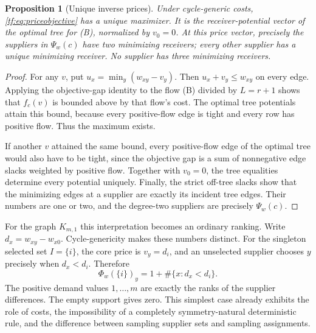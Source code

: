 \documentclass[11pt]{article}
\numberwithin{equation}{section}
\newtheorem{proposition}[theorem]{Proposition}
\theoremstyle{definition}
\begin{document}
\begin{proposition}[Unique inverse prices]
\label{tf:prop:prices}
Under cycle-generic costs, \eqref{tf:eq:priceobjective} has a unique
maximizer. It is the receiver-potential vector of the optimal tree for
(B), normalized by $v_0=0$. At this price vector, precisely the suppliers
in $\Psi_w(c)$ have two minimizing receivers; every other supplier has a
unique minimizing receiver. No supplier has three minimizing receivers.
\end{proposition}
\begin{proof}
For any $v$, put $u_x=\min_y(w_{xy}-v_y)$. Then
$u_x+v_y\le w_{xy}$ on every edge. Applying the objective-gap identity
to the flow (B) divided by $L=r+1$ shows that $f_c(v)$ is bounded above
by that flow's cost. The optimal tree potentials attain this bound,
because every positive-flow edge is tight and every row has positive
flow. Thus the maximum exists.

If another $v$ attained the same bound, every positive-flow edge of the
optimal tree would also have to be tight, since the objective gap is a
sum of nonnegative edge slacks weighted by positive flow. Together with
$v_0=0$, the tree equalities determine every potential uniquely.
Finally, the strict off-tree slacks show that the minimizing edges at a
supplier are exactly its incident tree edges. Their numbers are one or
two, and the degree-two suppliers are precisely $\Psi_w(c)$.
\end{proof}

For the graph $K_{m,1}$ this interpretation becomes an ordinary ranking.
Write $d_x=w_{xy}-w_{x0}$. Cycle-genericity makes these numbers distinct.
For the singleton selected set $I=\{i\}$, the core price is $v_y=d_i$,
and an unselected supplier chooses $y$ precisely when $d_x<d_i$.
Therefore
\[
 \Phi_w(\{i\})_y=1+\#\{x:d_x<d_i\}.
\]
The positive demand values $1,\ldots,m$ are exactly the ranks of the
supplier differences. The empty support gives zero. This simplest case
already exhibits the role of costs, the impossibility of a completely
symmetry-natural deterministic rule, and the difference between sampling
supplier sets and sampling assignments.
\end{document}
